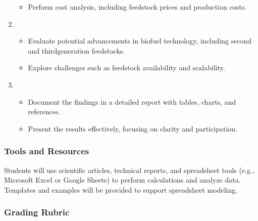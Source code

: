 \documentclass[letterpaper,10pt,english]{jupyterBook}
\begin{document}
\begin{enumerate}
\begin{itemize}
\item {} 
\sphinxAtStartPar
Perform cost analysis, including feedstock prices and production costs.

\end{itemize}

\item {} 
\sphinxAtStartPar
{}
\begin{itemize}
\item {} 
\sphinxAtStartPar
Evaluate potential advancements in biofuel technology, including second\sphinxhyphen{} and third\sphinxhyphen{}generation feedstocks.

\item {} 
\sphinxAtStartPar
Explore challenges such as feedstock availability and scalability.

\end{itemize}

\item {} 
\sphinxAtStartPar
{}
\begin{itemize}
\item {} 
\sphinxAtStartPar
Document the findings in a detailed report with tables, charts, and references.

\item {} 
\sphinxAtStartPar
Present the results effectively, focusing on clarity and participation.

\end{itemize}

\end{enumerate}


\subsubsection{Tools and Resources}
\label{\detokenize{ProjectSyllabus:id25}}
\sphinxAtStartPar
Students will use scientific articles, technical reports, and spreadsheet tools (e.g., Microsoft Excel or Google Sheets) to perform calculations and analyze data. Templates and examples will be provided to support spreadsheet modeling.


\subsubsection{Grading Rubric}
\label{\detokenize{ProjectSyllabus:id26}}
\end{document}
